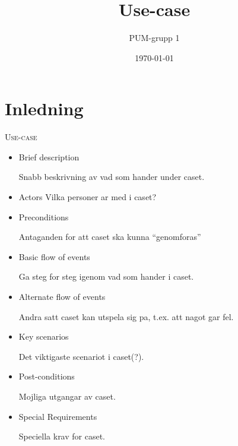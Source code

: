 

\ifpdf
\else
\fi

\title{Use-case}
\author{PUM-grupp 1}
\date{\today}



\maketitle\thispagestyle{empty}

\newpage

\section{Inledning}
\textsc{\LARGE Use-case}

\begin{itemize}
	\item Brief description
	
	Snabb beskrivning av vad som hander under caset.
	\item Actors
	Vilka personer ar med i caset?
	
	\item Preconditions
	
	Antaganden for att caset ska kunna "`genomforas"'
	\item Basic flow of events
	
	Ga steg for steg igenom vad som hander i caset.
	\item Alternate flow of events
	
	Andra satt caset kan utspela sig pa, t.ex. att nagot gar fel.
	\item Key scenarios
	
	Det viktigaste scenariot i caset(?).
	\item Post-conditions
	
	Mojliga utgangar av caset.
	\item Special Requirements
	
	Speciella krav for caset.
\end{itemize}

